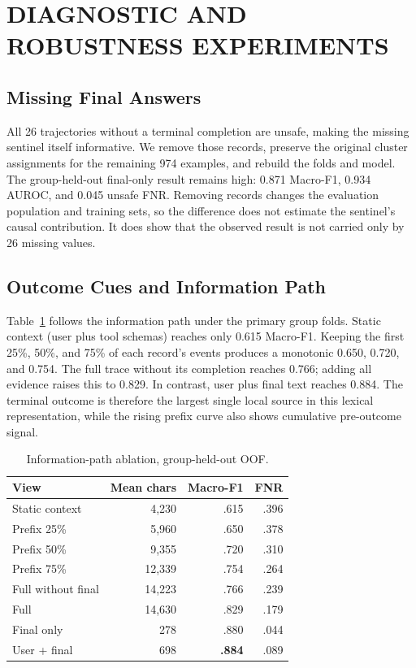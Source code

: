 \documentclass[10pt,twocolumn,twoside]{article}
\newcommand{\mf}{Macro-F1}
\begin{document}

\section{DIAGNOSTIC AND ROBUSTNESS EXPERIMENTS}

\subsection{Missing Final Answers}
All 26 trajectories without a terminal completion are unsafe, making the missing
sentinel itself informative. We remove those records, preserve the original cluster
assignments for the remaining 974 examples, and rebuild the folds and model. The
group-held-out final-only result remains high: 0.871 Macro-F1, 0.934 AUROC, and
0.045 unsafe FNR. Removing records changes the evaluation population and training
sets, so the difference does not estimate the sentinel's causal contribution. It
does show that the observed result is not carried only by 26 missing values.

\subsection{Outcome Cues and Information Path}
Table~\ref{tab:informationpath} follows the information path under the primary
group folds. Static context (user plus tool schemas) reaches only 0.615 Macro-F1.
Keeping the first 25\%, 50\%, and 75\% of each record's events produces a monotonic
0.650, 0.720, and 0.754. The full trace without its completion reaches 0.766; adding
all evidence raises this to 0.829. In contrast, user plus final text reaches 0.884.
The terminal outcome is therefore the largest single local source in this lexical
representation, while the rising prefix curve also shows cumulative pre-outcome
signal.

\begin{table}[t]
\centering
\caption{Information-path ablation, group-held-out OOF.}
\label{tab:informationpath}
\scriptsize
\begin{tabular}{lrrr}
\toprule
View & Mean chars & \mf{} & FNR \\
\midrule
Static context & 4,230 & .615 & .396 \\
Prefix 25\% & 5,960 & .650 & .378 \\
Prefix 50\% & 9,355 & .720 & .310 \\
Prefix 75\% & 12,339 & .754 & .264 \\
Full without final & 14,223 & .766 & .239 \\
Full & 14,630 & .829 & .179 \\
Final only & 278 & .880 & .044 \\
User + final & 698 & \textbf{.884} & .089 \\
\bottomrule
\end{tabular}
\end{table}
\end{document}
